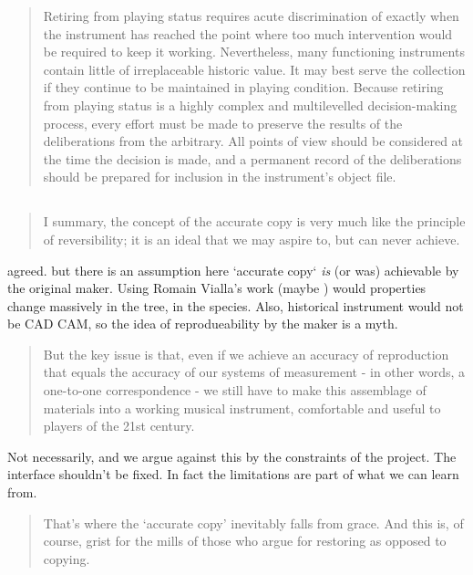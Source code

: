 \begin{quotation}
    Retiring from playing status requires acute discrimination of exactly when
    the instrument has reached the point where too much intervention would be
    required to keep it working. Nevertheless, many functioning instruments
    contain little of irreplaceable historic value. It may best serve the
    collection if they continue to be maintained in playing condition. Because
    retiring from playing status is a highly complex and multilevelled
    decision-making process, every effort must be made to preserve the results
    of the deliberations from the arbitrary. All points of view should be
    considered at the time the decision is made, and a permanent record of the
    deliberations should be prepared for inclusion in the instrument's object
    file.
\end{quotation}


\subsection{\cite{barclay_preservation_2005}}

\begin{quotation}
    I summary, the concept of the accurate copy is very much like the principle
    of reversibility; it is an ideal that we may aspire to, but can never
    achieve. 
\end{quotation}

agreed. but there is an assumption here `accurate copy` \textit{is} (or was)
achievable by the original maker. Using Romain Vialla's work (maybe
\cite{viala_effect_2024}) would properties change massively in the tree, in the
species. Also, historical instrument would not be CAD CAM, so the idea of
reprodueability by the maker is a myth.

\begin{quotation}
But the key issue is that, even if we achieve an accuracy of reproduction that
equals the accuracy of our systems of measurement - in other words, a one-to-one
correspondence - we still have to make this assemblage of materials into a
working musical instrument, comfortable and useful to players of the 21st
century. 
\end{quotation}

Not necessarily, and we argue against this by the constraints of the project.
The interface shouldn't be fixed. In fact the limitations are part of what we
can learn from.

\begin{quotation}
That's where the `accurate copy' inevitably falls from grace. And this is, of
course, grist for the mills of those who argue for restoring as opposed to
copying.
\end{quotation}

